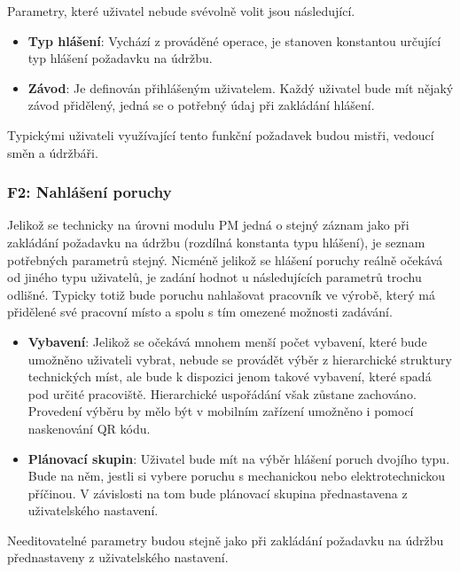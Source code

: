 \documentclass[thesis=M,czech]{FITthesis}[2012/06/26]
\begin{document}
Parametry, které uživatel nebude svévolně volit jsou následující.
\begin{itemize}
	\item
	\textbf{Typ hlášení}: Vychází z prováděné operace, je stanoven konstantou určující typ hlášení požadavku na údržbu.
	\item
	\textbf{Závod}: Je definován přihlášeným uživatelem. Každý uživatel bude mít nějaký závod přidělený, jedná se o potřebný údaj při zakládání hlášení.
\end{itemize} 
Typickými uživateli využívající tento funkční požadavek budou mistři, vedoucí směn a údržbáři.
\subsubsection{F2: Nahlášení poruchy}
\label{sscec:fc_nahlaseni_poruchy}
Jelikož se technicky na úrovni modulu PM jedná o stejný záznam jako při zakládání požadavku na údržbu (rozdílná konstanta typu hlášení), je seznam potřebných parametrů stejný. Nicméně jelikož se hlášení poruchy reálně očekává od jiného typu uživatelů, je zadání hodnot u následujících parametrů trochu odlišné. Typicky totiž bude poruchu nahlašovat pracovník ve výrobě, který má přidělené své pracovní místo a spolu s tím omezené možnosti zadávání. 
\begin{itemize}
	\item
	\textbf{Vybavení}: Jelikož se očekává mnohem menší počet vybavení, které bude umožněno uživateli vybrat, nebude se provádět výběr z hierarchické struktury technických míst, ale bude k dispozici jenom takové vybavení, které spadá pod určité pracoviště. Hierarchické uspořádání však zůstane zachováno. Provedení výběru by mělo být v mobilním zařízení umožněno i pomocí naskenování QR kódu.
	\item
	\textbf{Plánovací skupin}: Uživatel bude mít na výběr hlášení poruch dvojího typu. Bude na něm, jestli si vybere poruchu s mechanickou nebo elektrotechnickou příčinou. V závislosti na tom bude plánovací skupina přednastavena z uživatelského nastavení.
\end{itemize} 
Needitovatelné parametry budou stejně jako při zakládání požadavku na údržbu přednastaveny z uživatelského nastavení.
\end{document}

